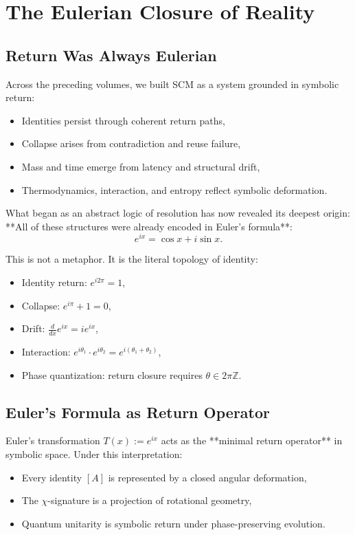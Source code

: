 \chapter{The Eulerian Closure of Reality} \label{chapter:eulerian-closure}

\section{Return Was Always Eulerian}

Across the preceding volumes, we built SCM as a system grounded in symbolic return:
\begin{itemize}
    \item Identities persist through coherent return paths,
    \item Collapse arises from contradiction and reuse failure,
    \item Mass and time emerge from latency and structural drift,
    \item Thermodynamics, interaction, and entropy reflect symbolic deformation.
\end{itemize}

What began as an abstract logic of resolution has now revealed its deepest origin:  
**All of these structures were already encoded in Euler’s formula**:
\[
e^{ix} = \cos x + i \sin x.
\]

\noindent This is not a metaphor. It is the literal topology of identity:
\begin{itemize}
    \item Identity return: $e^{i2\pi} = 1$,
    \item Collapse: $e^{i\pi} + 1 = 0$,
    \item Drift: $\frac{d}{dx} e^{ix} = i e^{ix}$,
    \item Interaction: $e^{i\theta_1} \cdot e^{i\theta_2} = e^{i(\theta_1 + \theta_2)}$,
    \item Phase quantization: return closure requires $\theta \in 2\pi \mathbb{Z}$.
\end{itemize}

\section{Euler’s Formula as Return Operator}

Euler’s transformation $T(x) := e^{ix}$ acts as the **minimal return operator** in symbolic space. Under this interpretation:
\begin{itemize}
    \item Every identity $[A]$ is represented by a closed angular deformation,
    \item The $\chi$-signature is a projection of rotational geometry,
    \item Quantum unitarity is symbolic return under phase-preserving evolution.
\end{itemize}

